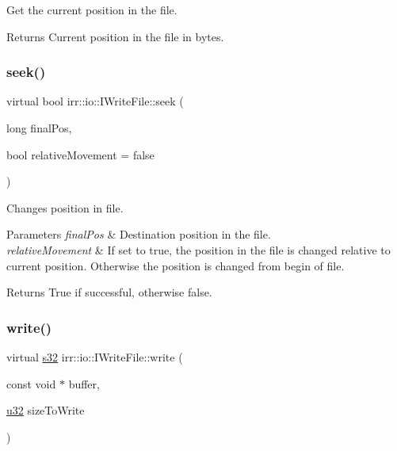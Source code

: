 Get the current position in the file. 

\begin{DoxyReturn}{Returns}
Current position in the file in bytes. 
\end{DoxyReturn}
\mbox{\label{classirr_1_1io_1_1IWriteFile_ad68289024b2a2079fce20ca9b95c9519}} 
\subsubsection{\texorpdfstring{seek()}{seek()}}
{\footnotesize\ttfamily virtual bool irr\+::io\+::\+I\+Write\+File\+::seek (\begin{DoxyParamCaption}\item[{long}]{final\+Pos,  }\item[{bool}]{relative\+Movement = {\ttfamily false} }\end{DoxyParamCaption})\hspace{0.3cm}{\ttfamily [pure virtual]}}



Changes position in file. 


\begin{DoxyParams}{Parameters}
{\em final\+Pos} & Destination position in the file. \\
\hline
{\em relative\+Movement} & If set to true, the position in the file is changed relative to current position. Otherwise the position is changed from begin of file. \\
\hline
\end{DoxyParams}
\begin{DoxyReturn}{Returns}
True if successful, otherwise false. 
\end{DoxyReturn}
\mbox{\label{classirr_1_1io_1_1IWriteFile_a32ce2fb186c4a21fcf3c85adb13c7c77}} 
\subsubsection{\texorpdfstring{write()}{write()}}
{\footnotesize\ttfamily virtual \hyperlink{namespaceirr_ac66849b7a6ed16e30ebede579f9b47c6}{s32} irr\+::io\+::\+I\+Write\+File\+::write (\begin{DoxyParamCaption}\item[{const void $\ast$}]{buffer,  }\item[{\hyperlink{namespaceirr_a0416a53257075833e7002efd0a18e804}{u32}}]{size\+To\+Write }\end{DoxyParamCaption})\hspace{0.3cm}{\ttfamily [pure virtual]}}



